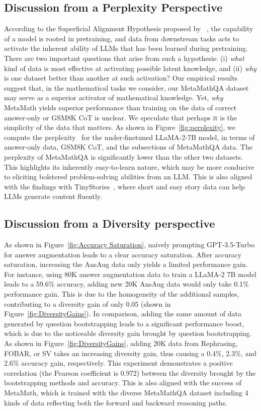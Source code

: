     \subsection{Discussion from a Perplexity Perspective}    

    According to the Superficial Alignment Hypothesis proposed by ~\citet{zhou2023lima}, the capability of a model is rooted in pretraining, and data from downstream tasks acts to activate the inherent ability of LLMs that has been learned during pretraining. There are two important questions that arise from such a hypothesis: (i) \textit{what} kind of data is most effective at activating possible latent knowledge, and (ii) \textit{why} is one dataset better than another at such activation? Our empirical results suggest that, in the mathematical tasks we consider, our MetaMathQA dataset may serve as a superior activator of mathematical knowledge. Yet, \textit{why} MetaMath yields superior performance than training on the data of correct answer-only or GSM8K CoT is unclear. We speculate that perhaps it is the simplicity of the data that matters. As shown in Figure~\ref{fig:perplexity}, we compute the perplexity~\citep{wang2023making,marion2023less} for the under-finetuned {LLaMA-2-7B} model, in terms of answer-only data, GSM8K CoT, and the subsections of {MetaMathQA} data. The perplexity of {MetaMathQA} is significantly lower than the other two datasets. This highlights its inherently easy-to-learn nature, which may be more conducive to eliciting bolstered problem-solving abilities from an LLM. This is also aligned with the findings with TinyStories~\citep{eldan2023tinystories}, where short and easy story data can help LLMs generate content fluently.

    \subsection{Discussion from a Diversity perspective}

    As shown in Figure~\ref{fig:Accuracy Saturation}, naively prompting GPT-3.5-Turbo for answer augmentation leads to a clear accuracy saturation. After accuracy saturation, increasing the AnsAug data only yields a limited performance gain. For instance, using 80K answer augmentation data to train a LLaMA-2 7B model leads to a 59.6\% accuracy, adding new 20K AnsAug data would only take 0.1\% performance gain. This is due to the homogeneity of the additional samples, contributing to a diversity gain of only 0.05 (shown in Figure~\ref{fig:DiversityGains}). In comparison, adding the same amount of data generated by question bootstrapping leads to a significant performance boost, which is due to the noticeable diversity gain brought by question bootstrapping. As shown in Figure~\ref{fig:DiversityGains}, adding 20K data from Rephrasing, FOBAR, or SV takes an increasing diversity gain, thus causing a 0.4\%, 2.3\%, and 2.6\% accuracy gain, respectively. This experiment demonstrates a positive correlation (the Pearson coefficient is 0.972) between the diversity brought by the bootstrapping methods and accuracy. This is also aligned with the success of MetaMath, which is trained with the diverse MetaMathQA dataset including 4 kinds of data reflecting both the forward and backward reasoning paths.

